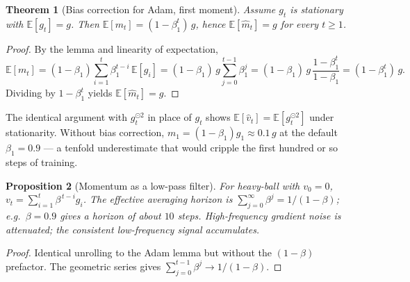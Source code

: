 \documentclass[11pt]{article}
\newtheorem{theorem}{Theorem}[section]
\newtheorem{proposition}[theorem]{Proposition}
\theoremstyle{remark}
\begin{document}
\begin{theorem}[Bias correction for Adam, first moment]
Assume $g_t$ is stationary with $\mathbb{E}[g_t] = g$. Then $\mathbb{E}[m_t] = (1 - \beta_1^t)\, g$, hence $\mathbb{E}[\hat m_t] = g$ for every $t \geq 1$.
\end{theorem}
\begin{proof}
By the lemma and linearity of expectation,
\[
\mathbb{E}[m_t] = (1-\beta_1)\sum_{i=1}^t \beta_1^{t-i}\, \mathbb{E}[g_i] = (1-\beta_1)\, g \sum_{j=0}^{t-1}\beta_1^{j} = (1-\beta_1)\, g\, \frac{1 - \beta_1^t}{1-\beta_1} = (1-\beta_1^t)\, g.
\]
Dividing by $1 - \beta_1^t$ yields $\mathbb{E}[\hat m_t] = g$.
\end{proof}

The identical argument with $g_t^{\odot 2}$ in place of $g_t$ shows $\mathbb{E}[\hat v_t] = \mathbb{E}[g_t^{\odot 2}]$ under stationarity. Without bias correction, $m_1 = (1-\beta_1)g_1 \approx 0.1\, g$ at the default $\beta_1 = 0.9$ --- a tenfold underestimate that would cripple the first hundred or so steps of training.

\begin{proposition}[Momentum as a low-pass filter]
For heavy-ball with $v_0 = 0$, $v_t = \sum_{i=1}^t \beta^{\,t-i} g_i$. The effective averaging horizon is $\sum_{j=0}^\infty \beta^j = 1/(1-\beta)$; e.g.\ $\beta = 0.9$ gives a horizon of about $10$ steps. High-frequency gradient noise is attenuated; the consistent low-frequency signal accumulates.
\end{proposition}
\begin{proof}
Identical unrolling to the Adam lemma but without the $(1-\beta)$ prefactor. The geometric series gives $\sum_{j=0}^{t-1}\beta^j \to 1/(1-\beta)$.
\end{proof}
\end{document}
